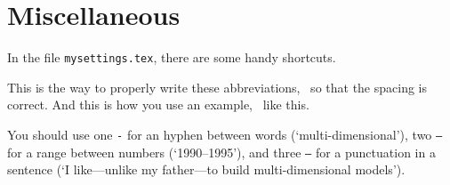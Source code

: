 %
\section{Miscellaneous}%
\label{sec:misc}

In the file \texttt{mysettings.tex}, there are some handy shortcuts.

This is the way to properly write these abbreviations, \ie\ so that the spacing is correct.
And this is how you use an example, \eg\ like this.

You should use one \texttt{-} for an hyphen between words (`multi-dimensional'), two \texttt{--} for a range between numbers (`1990--1995'), and three \texttt{---} for a punctuation in a sentence (`I like---unlike my father---to build multi-dimensional models').
